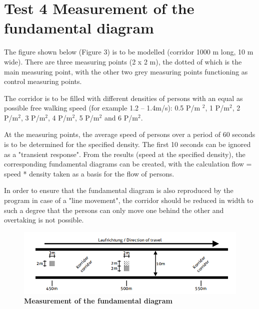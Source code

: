 \section*{Test 4 Measurement of the fundamental diagram}

The figure shown below (Figure 3) is to be modelled (corridor 1000 m long, 10 m wide). There are three measuring points (2 x 2 m), the dotted of which is the main measuring point, with the other two grey measuring points functioning as control measuring points.

\noindent
The corridor is to be filled with different densities of persons with an equal as possible free walking speed (for example 1.2 – 1.4m/s): 0.5 P/m $^2$, 1 P/m$^2$, 2 P/m$^2$, 3 P/m$^2$, 4 P/m$^2$, 5 P/m$^2$ and 6 P/m$^2$.

\noindent
At the measuring points, the average speed of persons over a period of 60 seconds is to be determined for the specified density. The first 10 seconds can be ignored as a "transient response". From the results (speed at the specified density), the corresponding fundamental diagrams can be created, with the calculation flow = speed * density taken as a basis for the flow of persons.
 
\noindent
In order to ensure that the fundamental diagram is also reproduced by the program in case of a "line movement", the corridor should be reduced in width to such a degree that the persons can only move one behind the other and overtaking is not possible.




\begin{figure}[h]
	\centering
	\includegraphics[scale=0.50]{test_description/Corridor_tets_4.png}
	\caption{\footnotesize \textbf{Measurement of the fundamental diagram}}
\end{figure}


